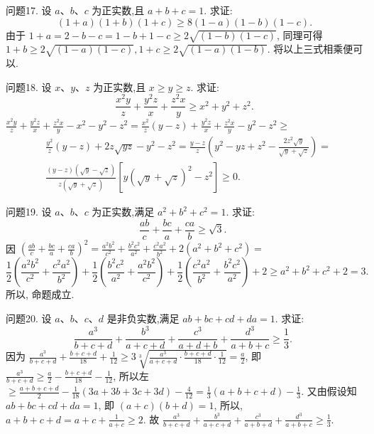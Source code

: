 问题17. 设 $a 、 b 、 c$ 为正实数,且 $a+b+c=1$. 求证:
$$
(1+a)(1+b)(1+c) \geqslant 8(1-a)(1-b)(1-c) .
$$
由于 $1+a=2-b-c=1-b+1-c \geqslant 2 \sqrt{(1-b)(1-c)}$, 同理可得 $1+b \geqslant 2 \sqrt{(1-a)(1-c)}, 1+c \geqslant 2 \sqrt{(1-a)(1-b)}$. 将以上三式相乘便可以.



问题18. 设 $x 、 y 、 z$ 为正实数,且 $x \geqslant y \geqslant z$. 求证:
$$
\frac{x^2 y}{z}+\frac{y^2 z}{x}+\frac{z^2 x}{y} \geqslant x^2+y^2+z^2 .
$$
$\frac{x^2 y}{z}+\frac{y^2 z}{x}+\frac{z^2 x}{y}-x^2-y^2-z^2=\frac{x^2}{z}(y-z)+\frac{y^2 z}{x}+\frac{z^2 x}{y}-y^2-z^2 \geqslant$
$$
\begin{aligned}
& \frac{y^2}{z}(y-z)+2 z \sqrt{y z}-y^2-z^2=\frac{y-z}{z}\left(y^2-y z+z^2-\frac{2 z^2 \sqrt{y}}{\sqrt{y}+\sqrt{z}}\right)= \\
& \frac{(y-z)(\sqrt{y}-\sqrt{z})}{z(\sqrt{y}+\sqrt{z})}\left[y(\sqrt{y}+\sqrt{z})^2-z^2\right] \geqslant 0 .
\end{aligned}
$$



问题19. 设 $a 、 b 、 c$ 为正实数,满足 $a^2+b^2+c^2=1$. 求证:
$$
\frac{a b}{c}+\frac{b c}{a}+\frac{c a}{b} \geqslant \sqrt{3} \text {. }
$$
因 $\left(\frac{a b}{c}+\frac{b c}{a}+\frac{c a}{b}\right)^2=\frac{a^2 b^2}{c^2}+\frac{b^2 c^2}{a^2}+\frac{c^2 a^2}{b^2}+2\left(a^2+b^2+c^2\right)=$
$$
\frac{1}{2}\left(\frac{a^2 b^2}{c^2}+\frac{c^2 a^2}{b^2}\right)+\frac{1}{2}\left(\frac{b^2 c^2}{a^2}+\frac{a^2 b^2}{c^2}\right)+\frac{1}{2}\left(\frac{c^2 a^2}{b^2}+\frac{b^2 c^2}{a^2}\right)+2 \geqslant a^2+b^2+c^2+2=3.
$$
所以, 命题成立.



问题20. 设 $a 、 b 、 c 、 d$ 是非负实数,满足 $a b+b c+c d+d a=1$. 求证:
$$
\frac{a^3}{b+c+d}+\frac{b^3}{a+c+d}+\frac{c^3}{a+d+b}+\frac{d^3}{a+b+c} \geqslant \frac{1}{3} \text {. }
$$
因为 $\frac{a^3}{b+c+d}+\frac{b+c+d}{18}+\frac{1}{12} \geqslant 3 \sqrt[3]{\frac{a^3}{a+c+d} \cdot \frac{b+c+d}{18} \cdot \frac{1}{12}}= \frac{a}{2}$, 即 $\frac{a^3}{b+c+d} \geqslant \frac{a}{2}-\frac{b+c+d}{18}-\frac{1}{12}$, 所以左 $\geqslant \frac{a+b+c+d}{2}-\frac{1}{18}(3 a+ 3 b+3 c+3 d)-\frac{4}{12}=\frac{1}{3}(a+b+c+d)-\frac{1}{3}$. 又由假设知 $a b+b c+c d+ d a=1$, 即 $(a+c)(b+d)=1$, 所以, $a+b+c+d=a+c+\frac{1}{a+c} \geqslant 2$. 故 $\frac{a^3}{b+c+d}+\frac{b^3}{a+c+d}+\frac{c^3}{a+b+d}+\frac{d^3}{a+b+c} \geqslant \frac{1}{3}$.




